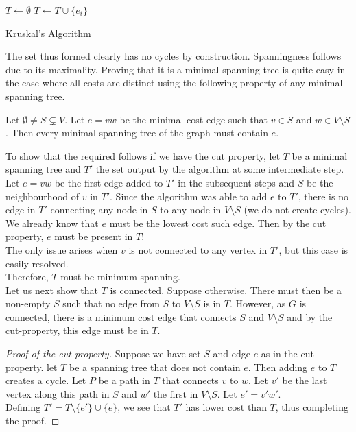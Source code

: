 \begin{algorithm}
	\DontPrintSemicolon
	\SetNoFillComment
	 
	$T\gets\emptyset$\;
	 {
		 {
			$T\gets T\cup\{e_i\}$
		}
	}
	\caption{Kruskal's Algorithm}\label{algo: kruskal's algorithm}
\end{algorithm}

The set thus formed clearly has no cycles by construction. Spanningness follows due to its maximality. Proving that it is a minimal spanning tree is quite easy in the case where all costs are distinct using the following property of any minimal spanning tree.

\begin{lemma*}
	Let $\emptyset\neq S\subsetneq V$. Let $e=vw$ be the minimal cost edge such that $v\in S$ and $w\in V\setminus S$. Then every minimal spanning tree of the graph must contain $e$.
\end{lemma*}

To show that the required follows if we have the cut property, let $T$ be a minimal spanning tree and $T'$ the set output by the algorithm at some intermediate step.\\
Let $e=vw$ be the first edge added to $T'$ in the subsequent steps and $S$ be the neighbourhood of $v$ in $T'$. Since the algorithm was able to add $e$ to $T'$, there is no edge in $T'$ connecting any node in $S$ to any node in $V\setminus S$ (we do not create cycles). We already know that $e$ must be the lowest cost such edge. Then by the cut property, $e$ must be present in $T$!\\
The only issue arises when $v$ is not connected to any vertex in $T'$, but this case is easily resolved.\\
Therefore, $T$ must be minimum spanning.\\

Let us next show that $T$ is connected. Suppose otherwise. There must then be a non-empty $S$ such that no edge from $S$ to $V\setminus S$ is in $T$. However, as $G$ is connected, there is a minimum cost edge that connects $S$ and $V\setminus S$ and by the cut-property, this edge must be in $T$.

\begin{proof}[Proof of the cut-property]
	Suppose we have set $S$ and edge $e$ as in the cut-property. let $T$ be a spanning tree that does not contain $e$. Then adding $e$ to $T$ creates a cycle. Let $P$ be a path in $T$ that connects $v$ to $w$. Let $v'$ be the last vertex along this path in $S$ and $w'$ the first in $V\setminus S$. Let $e'=v'w'$.\\
	Defining $T' = T\setminus\{e'\}\cup\{e\}$, we see that $T'$ has lower cost than $T$, thus completing the proof. 
\end{proof}

